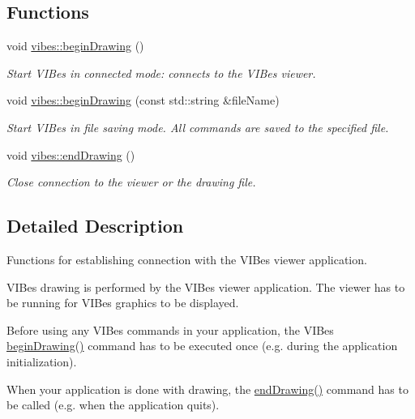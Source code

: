 \subsection*{Functions}
\begin{DoxyCompactItemize}
\item 
\mbox{\label{group__connection_ga8aabd902b41bbb5b865a3ba8be7ece76}} 
void \hyperlink{group__connection_ga8aabd902b41bbb5b865a3ba8be7ece76}{vibes\+::begin\+Drawing} ()
\begin{DoxyCompactList}\small\item\em Start V\+I\+Bes in connected mode\+: connects to the V\+I\+Bes viewer. \end{DoxyCompactList}\item 
\mbox{\label{group__connection_ga325194ea4b5f166c8e1dd975b5371e48}} 
void \hyperlink{group__connection_ga325194ea4b5f166c8e1dd975b5371e48}{vibes\+::begin\+Drawing} (const std\+::string \&file\+Name)
\begin{DoxyCompactList}\small\item\em Start V\+I\+Bes in file saving mode. All commands are saved to the specified file. \end{DoxyCompactList}\item 
\mbox{\label{group__connection_gacb8b0b5096e8457c761f228a017b1f6b}} 
void \hyperlink{group__connection_gacb8b0b5096e8457c761f228a017b1f6b}{vibes\+::end\+Drawing} ()
\begin{DoxyCompactList}\small\item\em Close connection to the viewer or the drawing file. \end{DoxyCompactList}\end{DoxyCompactItemize}


\subsection{Detailed Description}
Functions for establishing connection with the V\+I\+Bes viewer application. 

V\+I\+Bes drawing is performed by the V\+I\+Bes viewer application. The viewer has to be running for V\+I\+Bes graphics to be displayed.
\begin{DoxyItemize}
\item Before using any V\+I\+Bes commands in your application, the V\+I\+Bes {\ttfamily \hyperlink{group__connection_ga8aabd902b41bbb5b865a3ba8be7ece76}{begin\+Drawing()}} command has to be executed once (e.\+g. during the application initialization).
\item When your application is done with drawing, the {\ttfamily \hyperlink{group__connection_gacb8b0b5096e8457c761f228a017b1f6b}{end\+Drawing()}} command has to be called (e.\+g. when the application quits). 
\end{DoxyItemize}